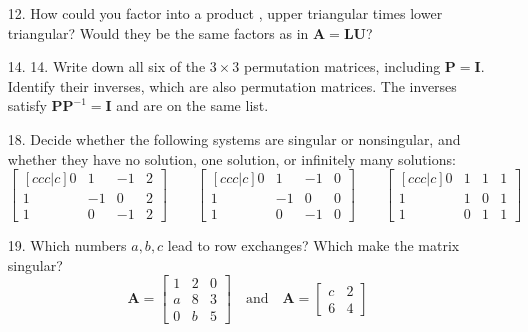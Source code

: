 \begin{itemize}
\begin{itemize}
      \item[12.]  How could you factor  into a product , upper
        triangular times lower triangular? Would they be the same factors as in
        \( \bm{A} = \bm{LU} \)?

      \item[14.] 14. Write down all six of the \( 3\times 3 \) permutation matrices,
        including \(\bm{P} = \bm{I}\). Identify their inverses, which are also
        permutation matrices. The inverses satisfy \(\bm{PP}^{-1} = \bm{I}\)
        and are on the same list.

      \item[18.] Decide whether the following systems are singular or
        nonsingular, and whether they have no solution, one solution, or
        infinitely many solutions:
        \[%
        \begin{bmatrix}[ccc|c]
          0 & 1 & -1 & 2 \\
          1 & -1 & 0 & 2 \\
          1 & 0 & -1 & 2
        \end{bmatrix} \qquad
        \begin{bmatrix}[ccc|c]
          0 & 1 & -1 & 0 \\
          1 & -1 & 0 & 0 \\
          1 & 0 & -1 & 0
        \end{bmatrix} \qquad
        \begin{bmatrix}[ccc|c]
          0 & 1 & 1 & 1 \\
          1 & 1 & 0 & 1 \\
          1 & 0 & 1 & 1
        \end{bmatrix}
        \]%

      \item[19.] Which numbers \(a, b, c\) lead to row exchanges? Which make the
        matrix singular?
        \[%
          \bm{A} = \begin{bmatrix}
            1 & 2 & 0  \\
            a & 8 & 3 \\
            0 & b & 5
          \end{bmatrix}\quad\text{and}\quad
          \bm{A} = \begin{bmatrix}
            c & 2 \\
            6 & 4
          \end{bmatrix}
        \]%

    \end{itemize}


\end{itemize}

